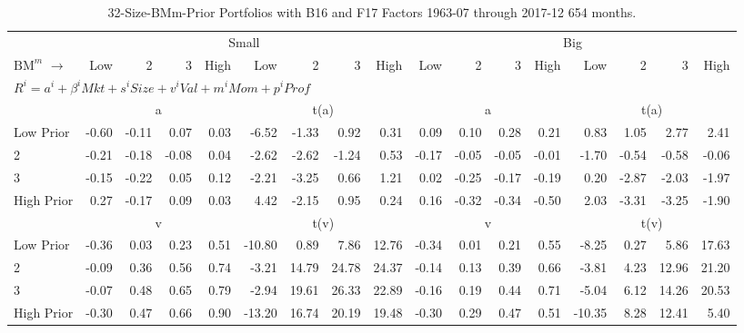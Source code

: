 
\begin{table}[!ht]
\scriptsize
\centering
\caption{32-Size-BMm-Prior Portfolios with B16 and F17 Factors 1963-07 through
2017-12 654 months.}
\begin{tabular}{lrrrrrrrrrrrrrrrr}
  \toprule
     & \multicolumn{8}{c}{Small} & \multicolumn{8}{c}{Big}  \\
     \cmidrule(r){2-9} \cmidrule(r){10-17}
    $\text{BM}^{m}$ $\rightarrow$ & Low & 2 & 3 & High & Low & 2 & 3 & High & Low & 2 & 3 & High & Low & 2 & 3 & High  \\ 
  \midrule
  \multicolumn{17}{l}{$R^i=a^i+\beta^iMkt+s^iSize+v^iVal+m^iMom+p^iProf$}  \\
  
     & \multicolumn{4}{c}{a} & \multicolumn{4}{c}{t(a)}  & \multicolumn{4}{c}{a} & \multicolumn{4}{c}{t(a)}   \\
     \cmidrule(r){2-5} \cmidrule(r){6-9}  \cmidrule(r){10-13} \cmidrule(r){14-17} 
    Low Prior  & -0.60  & -0.11  & 0.07  & 0.03  & -6.52  & -1.33  & 0.92  & 0.31  & 0.09  & 0.10  & 0.28  & 0.21  & 0.83  & 1.05  & 2.77  & 2.41   \\
    2  & -0.21  & -0.18  & -0.08  & 0.04  & -2.62  & -2.62  & -1.24  & 0.53  & -0.17  & -0.05  & -0.05  & -0.01  & -1.70  & -0.54  & -0.58  & -0.06   \\
    3  & -0.15  & -0.22  & 0.05  & 0.12  & -2.21  & -3.25  & 0.66  & 1.21  & 0.02  & -0.25  & -0.17  & -0.19  & 0.20  & -2.87  & -2.03  & -1.97   \\
    High Prior  & 0.27  & -0.17  & 0.09  & 0.03  & 4.42  & -2.15  & 0.95  & 0.24  & 0.16  & -0.32  & -0.34  & -0.50  & 2.03  & -3.31  & -3.25  & -1.90   \\
    
  
     & \multicolumn{4}{c}{v} & \multicolumn{4}{c}{t(v)}  & \multicolumn{4}{c}{v} & \multicolumn{4}{c}{t(v)}   \\
     \cmidrule(r){2-5} \cmidrule(r){6-9}  \cmidrule(r){10-13} \cmidrule(r){14-17} 
    Low Prior  & -0.36  & 0.03  & 0.23  & 0.51  & -10.80  & 0.89  & 7.86  & 12.76  & -0.34  & 0.01  & 0.21  & 0.55  & -8.25  & 0.27  & 5.86  & 17.63   \\
    2  & -0.09  & 0.36  & 0.56  & 0.74  & -3.21  & 14.79  & 24.78  & 24.37  & -0.14  & 0.13  & 0.39  & 0.66  & -3.81  & 4.23  & 12.96  & 21.20   \\
    3  & -0.07  & 0.48  & 0.65  & 0.79  & -2.94  & 19.61  & 26.33  & 22.89  & -0.16  & 0.19  & 0.44  & 0.71  & -5.04  & 6.12  & 14.26  & 20.53   \\
    High Prior  & -0.30  & 0.47  & 0.66  & 0.90  & -13.20  & 16.74  & 20.19  & 19.48  & -0.30  & 0.29  & 0.47  & 0.51  & -10.35  & 8.28  & 12.41  & 5.40   \\
    

\end{tabular}
\end{table}
